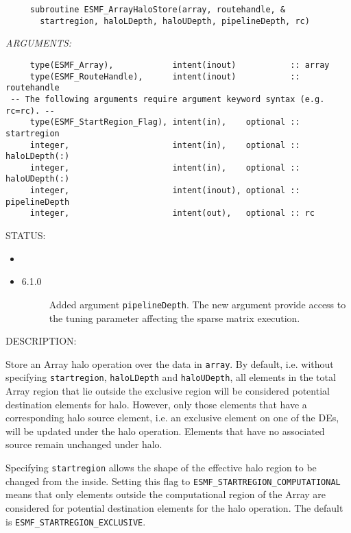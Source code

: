   
\begin{verbatim}     subroutine ESMF_ArrayHaloStore(array, routehandle, &
       startregion, haloLDepth, haloUDepth, pipelineDepth, rc)\end{verbatim}{\em ARGUMENTS:}
\begin{verbatim}     type(ESMF_Array),            intent(inout)           :: array
     type(ESMF_RouteHandle),      intent(inout)           :: routehandle
 -- The following arguments require argument keyword syntax (e.g. rc=rc). --
     type(ESMF_StartRegion_Flag), intent(in),    optional :: startregion
     integer,                     intent(in),    optional :: haloLDepth(:)
     integer,                     intent(in),    optional :: haloUDepth(:)
     integer,                     intent(inout), optional :: pipelineDepth
     integer,                     intent(out),   optional :: rc\end{verbatim}
{\sf STATUS:}
   \begin{itemize}
   \item{}
   \item{}
   \begin{description}
   \item[6.1.0] Added argument {\tt pipelineDepth}.
                The new argument provide access to the tuning parameter
                affecting the sparse matrix execution.
   \end{description}
   \end{itemize}
  
{\sf DESCRIPTION:\\ }


     Store an Array halo operation over the data in {\tt array}. By default,
     i.e. without specifying {\tt startregion}, {\tt haloLDepth} and
     {\tt haloUDepth}, all elements in the total Array region that lie outside
     the exclusive region will be considered potential destination elements for
     halo. However, only those elements that have a corresponding halo source
     element, i.e. an exclusive element on one of the DEs, will be updated under
     the halo operation. Elements that have no associated source remain 
     unchanged under halo.
  
     Specifying {\tt startregion} allows the shape of the effective halo region 
     to be changed from the inside. Setting this flag to
     {\tt ESMF\_STARTREGION\_COMPUTATIONAL} means that only elements outside 
     the computational region of the Array are considered for potential
     destination elements for the halo operation. The default is 
     {\tt ESMF\_STARTREGION\_EXCLUSIVE}.
  

